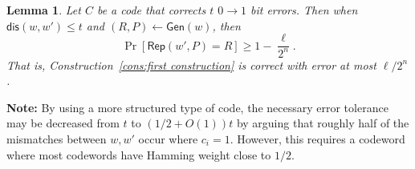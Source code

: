 \documentclass[11pt]{article}
\newcommand{\lemref}[1]{\mbox{Lemma~\ref{#1}}}
\newcommand{\consref}[1]{\mbox{Construction~\ref{#1}}}
\DeclareMathOperator*{\expe}{\mathbb{E}}
\newcommand{\class}[1]{{\ensuremath{\mathsf{#1}}}}
\newcommand{\gen}{\ensuremath{\class{Gen}}\xspace}
\newcommand{\rep}{\ensuremath{\class{Rep}}\xspace}
\newcommand{\dis}{\ensuremath{\mathsf{dis}}}
\newcommand{\ngl}{\ensuremath{\mathtt{ngl}}\xspace}
\newtheorem{lemma}[theorem]{Lemma}
\newcommand{\authnote}[2]{{\textcolor{red}{\textsf{#1 notes: }\textcolor{blue}{ #2}}\marginpar{\textcolor{red}{\textbf{!!!!!}}}}}
\newcommand{\authnote}[2]{}
\newcommand{\bnote}[1]{{\authnote{Ben}{#1}}}
\begin{document}
\begin{lemma}
\label{lem:correct of cons}
Let $C$ be a code that corrects $t$ $0\rightarrow 1$ bit errors.  Then when $\dis(w, w')\leq t$ and $(R, P)\leftarrow \gen(w)$, then 
\[
\Pr[\rep( w', P) = R] \geq 1-\frac{\ell}{2^n}.
\]
That is, \consref{cons:first construction} is correct with error at most $\ell/2^n$.
\end{lemma}

\textbf{Note: }By using a more structured type of code, the necessary error tolerance may be decreased from $t$ to  $(1/2+O(1))t$ by arguing that roughly half of the mismatches between $w, w'$ occur where $c_i =1$.  However, this requires a codeword where most codewords have Hamming weight close to $1/2$.

\end{document}
